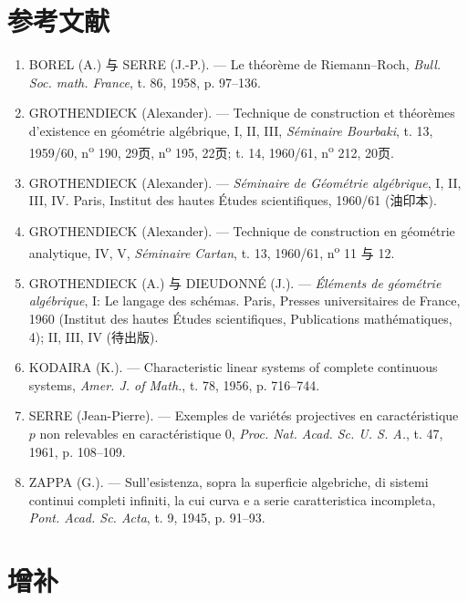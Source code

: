 \section*{参考文献}

\begin{enumerate}
\item[{[1]}]\label{fga3.iv-bib-1} BOREL (A.) 与 SERRE (J.-P.). --- Le théorème de Riemann--Roch, \emph{Bull. Soc. math. France}, t. 86, 1958, p. 97--136.
\item[{[2]}]\label{fga3.iv-bib-2} GROTHENDIECK (Alexander). --- Technique de construction et théorèmes d'existence en géométrie algébrique, I, II, III, \emph{Séminaire Bourbaki}, t. 13, 1959/60, n\textsuperscript{o} 190, 29页, n\textsuperscript{o} 195, 22页; t. 14, 1960/61, n\textsuperscript{o} 212, 20页.
\item[{[3]}]\label{fga3.iv-bib-3} GROTHENDIECK (Alexander). --- \emph{Séminaire de Géométrie algébrique}, I, II, III, IV. Paris, Institut des hautes Études scientifiques, 1960/61 (油印本).
\item[{[4]}]\label{fga3.iv-bib-4} GROTHENDIECK (Alexander). --- Technique de construction en géométrie analytique, IV, V, \emph{Séminaire Cartan}, t. 13, 1960/61, n\textsuperscript{o} 11 与 12.
\item[{[5]}]\label{fga3.iv-bib-5} GROTHENDIECK (A.) 与 DIEUDONNÉ (J.). --- \emph{Éléments de géométrie algébrique}, I: Le langage des schémas. Paris, Presses universitaires de France, 1960 (Institut des hautes Études scientifiques, Publications mathématiques, 4); II, III, IV (待出版).
\item[{[6]}]\label{fga3.iv-bib-6} KODAIRA (K.). --- Characteristic linear systems of complete continuous systems, \emph{Amer. J. of Math.}, t. 78, 1956, p. 716--744.
\item[{[7]}]\label{fga3.iv-bib-7} SERRE (Jean-Pierre). --- Exemples de variétés projectives en caractéristique \(p\) non relevables en caractéristique \(0\), \emph{Proc. Nat. Acad. Sc. U. S. A.}, t. 47, 1961, p. 108--109.
\item[{[8]}]\label{fga3.iv-bib-8} ZAPPA (G.). --- Sull'esistenza, sopra la superficie algebriche, di sistemi continui completi infiniti, la cui curva e a serie caratteristica incompleta, \emph{Pont. Acad. Sc. Acta}, t. 9, 1945, p. 91--93.

\end{enumerate}

\section*{增补}
\label{fga3.iv-additif}

